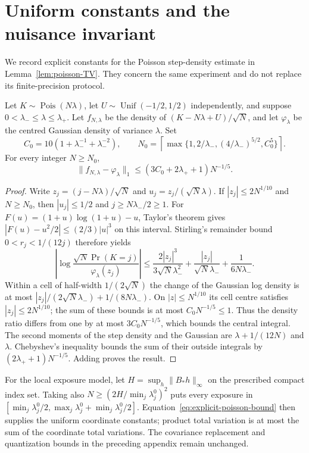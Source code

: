 \section{Uniform constants and the nuisance invariant}
\label{sec:uniform-constants}
We record explicit constants for the Poisson step-density estimate in
Lemma~\ref{lem:poisson-TV}. They concern the same experiment and do not
replace its finite-precision protocol.
\begin{proposition}
\label{prop:poisson-constants}
Let $K\sim\operatorname{Pois}(N\lambda)$, let
$U\sim\operatorname{Unif}(-1/2,1/2)$ independently, and suppose
$0<\lambda_-\le\lambda\le\lambda_+$. Let $f_{N,\lambda}$ be the
density of $(K-N\lambda+U)/\sqrt N$, and let $\varphi_\lambda$ be
the centred Gaussian density of variance $\lambda$. Set
\[
 C_0=10(1+\lambda_-^{-1}+\lambda_-^{-2}),\qquad
 N_0=\left\lceil\max\{1,2/\lambda_-,(4/\lambda_-)^{5/2},C_0^5\}\right\rceil.
\]
For every integer $N\ge N_0$,
\begin{equation}\label{eq:explicit-poisson-bound}
 \|f_{N,\lambda}-\varphi_\lambda\|_1
 \le (3C_0+2\lambda_++1)N^{-1/5}.
\end{equation}
\end{proposition}
\begin{proof}
Write $z_j=(j-N\lambda)/\sqrt N$ and
$u_j=z_j/(\sqrt N\lambda)$. If $|z_j|\le2N^{1/10}$ and
$N\ge N_0$, then $|u_j|\le1/2$ and $j\ge N\lambda_-/2\ge1$.
For $F(u)=(1+u)\log(1+u)-u$, Taylor's theorem gives
$|F(u)-u^2/2|\le(2/3)|u|^3$ on this interval.
Stirling's remainder bound $0<r_j<1/(12j)$ therefore yields
\[
 \left|\log\frac{\sqrt N\Pr(K=j)}{\varphi_\lambda(z_j)}\right|
 \le\frac{2|z_j|^3}{3\sqrt N\lambda_-^2}
       +\frac{|z_j|}{\sqrt N\lambda_-}
       +\frac1{6N\lambda_-}.
\]
Within a cell of half-width $1/(2\sqrt N)$ the change of the Gaussian
log density is at most
$|z_j|/(2\sqrt N\lambda_-)+1/(8N\lambda_-)$.
On $|z|\le N^{1/10}$ its cell centre satisfies
$|z_j|\le2N^{1/10}$; the sum of these bounds is at most
$C_0N^{-1/5}\le1$. Thus the density ratio differs from one by at
most $3C_0N^{-1/5}$, which bounds the central integral.
The second moments of the step density and the Gaussian are
$\lambda+1/(12N)$ and $\lambda$. Chebyshev's inequality bounds the
sum of their outside integrals by $(2\lambda_++1)N^{-1/5}$.
Adding proves the result.
\end{proof}
For the local exposure model, let
$H=\sup_h\|B_*h\|_\infty$ on the prescribed compact index set.
Taking also $N\ge(2H/\min_j\lambda_j^0)^2$ puts every exposure in
$[\min_j\lambda_j^0/2,\max_j\lambda_j^0+\min_j\lambda_j^0/2]$.
Equation~\eqref{eq:explicit-poisson-bound} then supplies the uniform
coordinate constants; product total variation is at most the sum of
the coordinate total variations. The covariance replacement and
quantization bounds in the preceding appendix remain unchanged.

